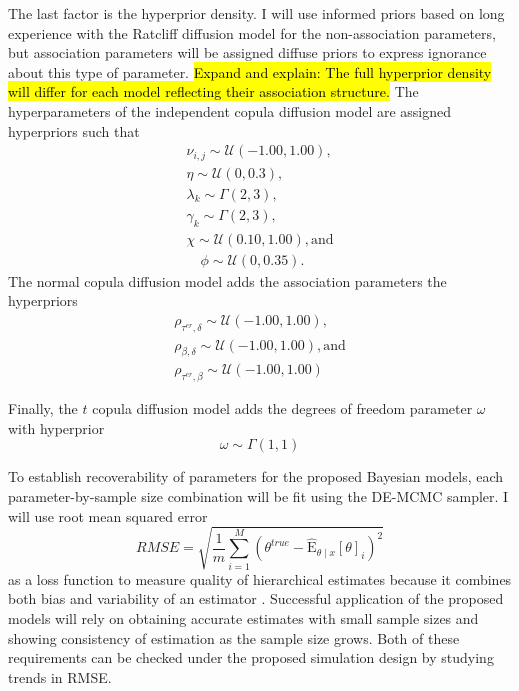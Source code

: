 \documentclass[12pt]{article}
\newcommand{\trish}[1]{\textrm{\hl{#1}}}
\begin{document}
The last factor is the hyperprior density. I
will use informed priors based on long experience with the Ratcliff
diffusion model \citep{MatWag2009} for the non-association parameters,
but association parameters will be assigned diffuse priors to express
ignorance about this type of parameter. \trish{Expand and explain: The
full hyperprior density will differ for each model reflecting their
association structure.} The hyperparameters of the independent copula diffusion model are
assigned hyperpriors such that
%
\begin{gather}
\nu_{i,j} \sim \mathcal{U}(-1.00, 1.00), \nonumber \\
\eta \sim \mathcal{U}(0, 0.3), \nonumber \\
\lambda_k \sim \Gamma(2, 3), \nonumber \\
\gamma_k \sim \Gamma(2, 3), \nonumber \\
\chi \sim \mathcal{U}(0.10, 1.00), \text{and} \nonumber \\
\quad \phi \sim \mathcal{U}(0, 0.35).
\end{gather}
%
The normal copula diffusion model adds the association parameters the hyperpriors
\begin{eqnarray}
\rho_{\tau^{er},\delta} \sim \mathcal{U}(-1.00, 1.00), \nonumber \\
\rho_{\beta,\delta} \sim \mathcal{U}(-1.00, 1.00), \text{and} \nonumber \\
\rho_{\tau^{er},\beta} \sim \mathcal{U}(-1.00, 1.00)
\end{eqnarray}

Finally, the $t$ copula diffusion model adds the degrees of freedom
parameter $\omega$ with hyperprior
%
\begin{equation}
\omega \sim \Gamma(1, 1)
\end{equation}
 
To establish recoverability of parameters for the proposed
Bayesian models, each parameter-by-sample size combination will be
fit using the DE-MCMC sampler.  I will use root mean squared error
%
\begin{equation}
RMSE = \sqrt{\frac{1}{m}\sum_{i=1}^M (\theta^{true} - \operatorname{\hat E}_{\theta \mid x}[\theta]_i)^2}
\end{equation}
%
as a loss function to measure quality of hierarchical estimates
because it combines both bias and variability of an estimator
\citep{CasBer2002,RatTue2002,RouLu2005}. Successful application of the
proposed models will rely on obtaining accurate estimates with small
sample sizes and showing consistency of estimation as the sample size
grows. Both of these requirements can be checked under the proposed
simulation design by studying trends in RMSE.
\end{document}
